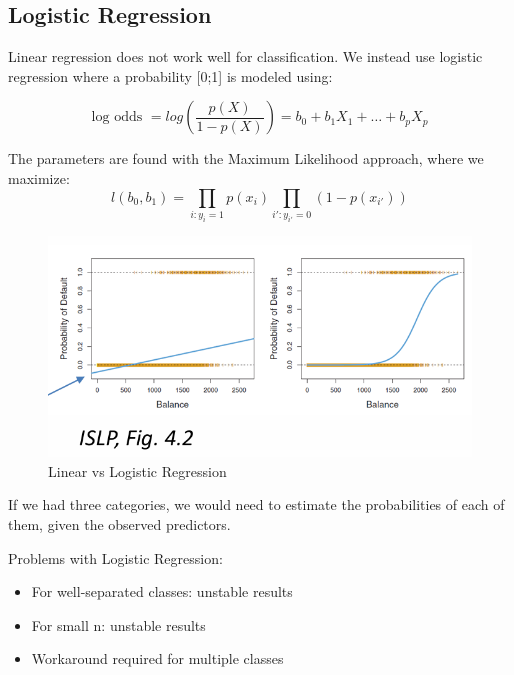 \documentclass[../Main.tex]{subfiles}
\begin{document}
\newpage
\subsection{Logistic Regression}
Linear regression does not work well for classification.
We instead use logistic regression where a probability [0;1] is modeled using:

 \begin{equation}
    \text{log odds } = log(\frac{p(X)}{1-p(X)}) = b_0 + b_1 X_1 + \dots + b_p X_p
 \end{equation}


 The parameters are found with the Maximum Likelihood approach, where we maximize:
 \begin{equation}
    l(b_0,b_1) = \prod_{i:y_i=1} p(x_i) \prod_{i':y_{i'}=0} (1-p(x_{i'}))
 \end{equation}

 \begin{figure}[H]
    \centering
    \includegraphics[width=0.75\linewidth]{Images/lin-reg-vs-log.png}
    \caption{Linear vs Logistic Regression}
\end{figure}

If we had three categories, we would 
need to estimate the probabilities of 
each of them, given the observed 
predictors.

Problems with Logistic Regression:
\begin{itemize}
    \item For well-separated classes: unstable results
    \item For small n: unstable results
    \item Workaround required for multiple classes
\end{itemize}
\end{document}
